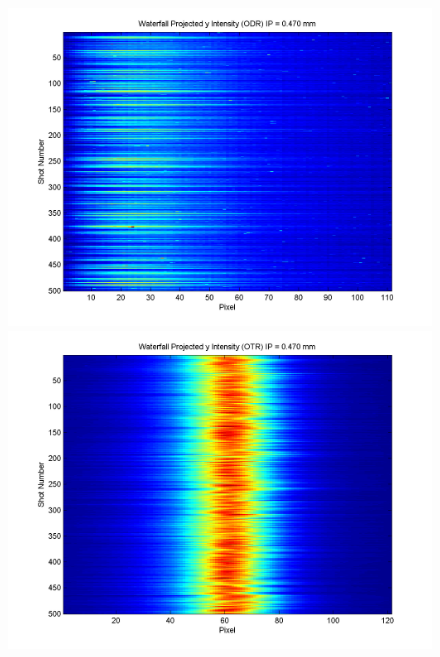 \documentclass[12pt]{article}
\begin{document}
\begin{figure}
\begin{center}
\includegraphics[scale=0.5]{Figures/ProjY_wfall_ODR_470.PNG}
\includegraphics[scale=0.5]{Figures/ProjY_wfall_OTR_470.PNG}
\caption{}
\end{center}
\end{figure}
\end{document}
